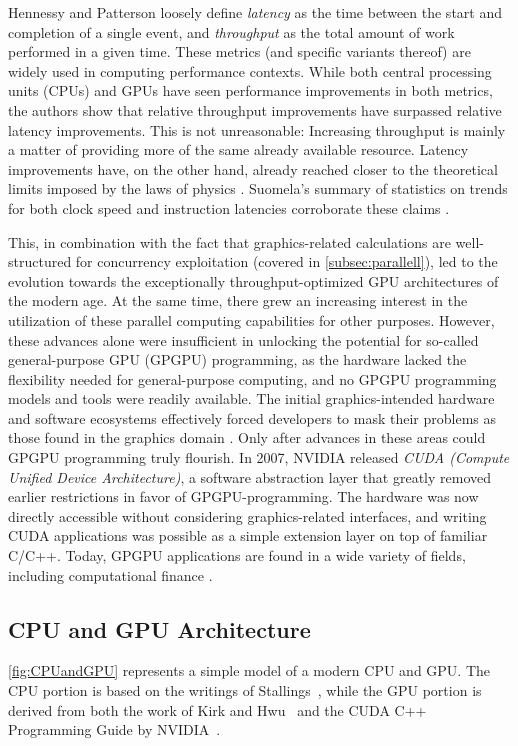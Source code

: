 \documentclass[english,12pt,a4paper,pdftex,sci,utf8]{aaltothesis}
\begin{document}
Hennessy and Patterson \cite{hennessy2011computer} loosely define \emph{latency} as the time between the start and completion of a single event, and \emph{throughput} as the total amount of work performed in a given time. These metrics (and specific variants thereof) are widely used in computing performance contexts. While both central processing units (CPUs) and GPUs have seen performance improvements in both metrics, the authors show that relative throughput improvements have surpassed relative latency improvements. This is not unreasonable: Increasing throughput is mainly a matter of providing more of the same already available resource. Latency improvements have, on the other hand, already reached closer to the theoretical limits imposed by the laws of physics \cite{hennessy2011computer} \cite{sanders2010cuda}. Suomela's summary of statistics on trends for both clock speed and instruction latencies corroborate these claims \cite{suomela_ppc}.

This, in combination with the fact that graphics-related calculations are well-structured for concurrency exploitation (covered in \cref{subsec:parallell}), led to the evolution towards the exceptionally throughput-optimized GPU architectures of the modern age. At the same time, there grew an increasing interest in the utilization of these parallel computing capabilities for other purposes. However, these advances alone were insufficient in unlocking the potential for so-called general-purpose GPU (GPGPU) programming, as the hardware lacked the flexibility needed for general-purpose computing, and no GPGPU programming models and tools were readily available. The initial graphics-intended hardware and software ecosystems effectively forced developers to mask their problems as those found in the graphics domain \cite{sanders2010cuda, kirk2016programming}. Only after advances in these areas could GPGPU programming truly flourish. In 2007, NVIDIA released \emph{CUDA (Compute Unified Device Architecture)}, a software abstraction layer that greatly removed earlier restrictions in favor of GPGPU-programming. The hardware was now directly accessible without considering graphics-related interfaces, and writing CUDA applications was possible as a simple extension layer on top of familiar C/C++. Today, GPGPU applications are found in a wide variety of fields, including computational finance \cite{sanders2010cuda, kirk2016programming}.

\subsection{CPU and GPU Architecture}
 \cref{fig:CPUandGPU} represents a simple model of a modern CPU and GPU. The CPU portion is based on the writings of Stallings~\cite{stallings2011operating}, while the GPU portion is derived from both the work of Kirk and Hwu~\cite{kirk2016programming} and the CUDA C++ Programming Guide by NVIDIA~\cite{cuda2025guide}. 
\end{document}
